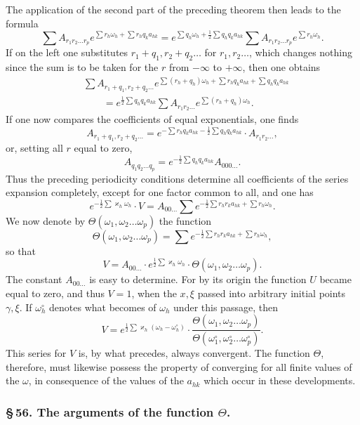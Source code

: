\documentclass[10pt]{article}
\begin{document}
The application of the second part of the preceding theorem then leads to the formula
\[
\sum A_{r_1r_2\ldots r_p}e^{\sum r_h\omega_h+\sum r_hq_ka_{hk}}
=e^{\sum q_h\omega_h+\frac12\sum q_hq_ka_{hk}}\sum A_{r_1r_2\ldots r_p}e^{\sum r_h\omega_h}.
\]
If on the left one substitutes \(r_1+q_1,r_2+q_2\ldots\) for \(r_1,r_2\ldots\), which changes nothing since the sum is to be taken for the \(r\) from \(-\infty\) to \(+\infty\), then one obtains
\[
\begin{aligned}
&\sum A_{r_1+q_1,r_2+q_2\ldots}e^{\sum(r_h+q_h)\omega_h+\sum r_hq_ka_{hk}+\sum q_hq_ka_{hk}}\\
&\qquad=e^{\frac12\sum q_hq_ka_{hk}}\sum A_{r_1r_2\ldots}e^{\sum(r_h+q_h)\omega_h}.
\end{aligned}
\]
If one now compares the coefficients of equal exponentials, one finds
\[
A_{r_1+q_1,r_2+q_2\ldots}=e^{-\sum r_hq_ka_{hk}-\frac12\sum q_hq_ka_{hk}}\cdot A_{r_1r_2\ldots},
\]
or, setting all \(r\) equal to zero,
\[
A_{q_1q_2\ldots q_p}=e^{-\frac12\sum q_hq_ka_{hk}}A_{000\ldots}.
\]
Thus the preceding periodicity conditions determine all coefficients of the series expansion completely, except for one factor common to all, and one has
\[
e^{-\frac12\sum\varkappa_h\omega_h}\cdot V=A_{00\ldots}\sum e^{-\frac12\sum r_hr_ka_{hk}+\sum r_h\omega_h}.
\]
We now denote by \(\Theta(\omega_1,\omega_2\ldots\omega_p)\) the function
\[
\tag{2}\Theta(\omega_1,\omega_2\ldots\omega_p)=\sum e^{-\frac12\sum r_hr_ka_{hk}+\sum r_h\omega_h},
\]
so that
\[
V=A_{00\ldots}\cdot e^{\frac12\sum\varkappa_h\omega_h}\cdot\Theta(\omega_1,\omega_2\ldots\omega_p).
\]
The constant \(A_{00\ldots}\) is easy to determine. For by its origin the function \(U\) became equal to zero, and thus \(V=1\), when the \(x,\xi\) passed into arbitrary initial points \(\gamma,\xi\). If \(\omega_h^{\circ}\) denotes what becomes of \(\omega_h\) under this passage, then
\[
\tag{3}V=e^{\frac12\sum\varkappa_h(\omega_h-\omega_h^{\circ})}\cdot\frac{\Theta(\omega_1,\omega_2\ldots\omega_p)}{\Theta(\omega_1^{\circ},\omega_2^{\circ}\ldots\omega_p^{\circ})}.
\]
This series for \(V\) is, by what precedes, always convergent. The function \(\Theta\), therefore, must likewise possess the property of converging for all finite values of the \(\omega\), in consequence of the values of the \(a_{hk}\) which occur in these developments.

\subsubsection*{\S\,56. The arguments of the function \(\Theta\).}
\end{document}
